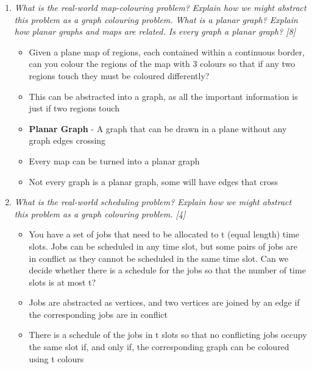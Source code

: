 \documentclass{article}[18pt]
\begin{document}
\begin{enumerate}
	\item \textit{What is the real-world map-colouring problem? Explain how we might abstract this problem as a graph colouring problem. What is a planar graph? Explain how planar graphs and maps are related. Is every graph a planar graph? [8]}
	\begin{itemize}
		\item Given a plane map of regions, each contained within a continuous border, can you colour the regions of the map with 3 colours so that if any two regions touch they must be coloured differently?
		\item This can be abstracted into a graph, as all the important information is just if two regions touch
		\item \textbf{Planar Graph} - A graph that can be drawn in a plane without any graph edges crossing
		\item Every map can be turned into a planar graph
		\item Not every graph is a planar graph, some will have edges that cross
	\end{itemize}	
	
	\item \textit{What is the real-world scheduling problem? Explain how we might abstract this problem as a graph colouring problem. [4]}
	\begin{itemize}
		\item You have a set of jobs that need to be allocated to t (equal length) time slots. Jobs can be scheduled in any time slot, but some pairs of jobs are in conflict as they cannot be scheduled in the same time slot. Can we decide whether there is a schedule for the jobs so that the number of time slots is at most t?
		\item Jobs are abstracted as vertices, and two vertices are joined by an edge if the corresponding jobs are in conflict
		\item There is a schedule of the jobs in t slots so that no conflicting jobs occupy the same slot if, and only if, the corresponding graph can be coloured using t colours
	\end{itemize}
	

\end{enumerate}
\end{document}

